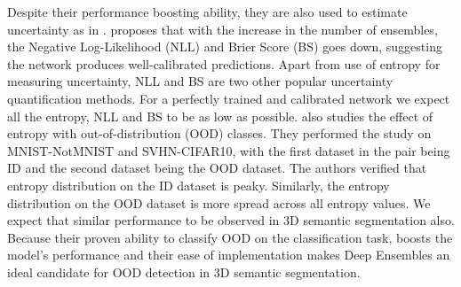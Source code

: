 Despite their performance boosting ability, they are also used to estimate uncertainty as in \cite{lakshminarayanan2016simple}.
\cite{lakshminarayanan2016simple} proposes that with the increase in the number of ensembles, the Negative Log-Likelihood (NLL) and Brier Score (BS) goes down, suggesting the network produces well-calibrated predictions.
Apart from use of entropy for measuring uncertainty, NLL and BS are two other popular uncertainty quantification methods.
For a perfectly trained and calibrated network we expect all the entropy, NLL and BS to be as low as possible.
\cite{lakshminarayanan2016simple} also studies the effect of entropy with out-of-distribution (OOD) classes.
They performed the study on MNIST-NotMNIST and SVHN-CIFAR10, with the first dataset in the pair being ID and the second dataset being the OOD dataset.
The authors verified that entropy distribution on the ID dataset is peaky. Similarly, the entropy distribution on the OOD dataset is more spread across all entropy values.
We expect that similar performance to be observed in 3D semantic segmentation also.
Because their proven ability to classify OOD on the classification task, boosts the model's performance and their ease of implementation makes Deep Ensembles an ideal candidate for OOD detection in 3D semantic segmentation.

